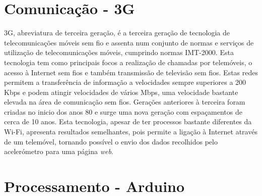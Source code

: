 \section{Comunicação - 3G}
\label{sec:3g}

3G, abreviatura de terceira geração, é a terceira geração de tecnologia de telecomunicações móveis sem fio e assenta num conjunto de normas e serviços de utilização de telecomunicações móveis, cumprindo normas IMT-2000.
Esta tecnologia tem como principais focos a realização de chamadas por telemóveis, o acesso à Internet sem fios e também transmissão de televisão sem fios.
Estas redes permitem a transferência de informação a velocidades sempre superiores a 200 Kbps e podem atingir velocidades de vários Mbps, uma velocidade bastante elevada na área de comunicação sem fios.
Gerações anteriores à terceira foram criadas no inicio dos anos 80 e surge uma nova geração com espaçamentos de cerca de 10 anos.
Esta tecnologia, apesar de ter processos bastante diferentes da Wi-Fi, apresenta resultados semelhantes, pois permite a ligação à Internet através de um telemóvel, tornando possível o envio dos dados recolhidos pelo acelerómetro para uma página \emph{web}.

\section{Processamento - Arduino}
\label{sec:arduino}

